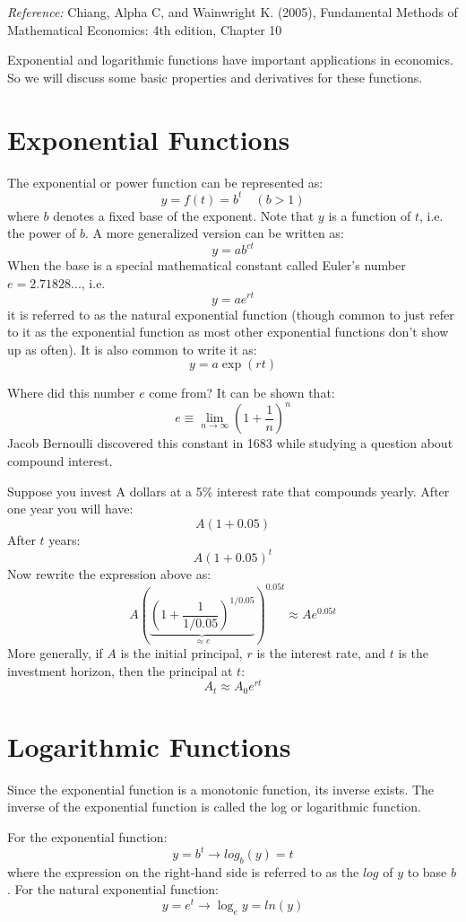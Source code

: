 \documentclass{./../Latex/handout}
\begin{document}
\thispagestyle{plain}

\textit{Reference:} Chiang, Alpha C, and Wainwright K. (2005), Fundamental Methods of Mathematical Economics: 4th edition, Chapter 10 

Exponential and logarithmic functions have important applications in economics. So we will discuss some basic properties and derivatives for these functions.

\section{Exponential Functions}
The exponential or power function can be represented as:
$$
y=f(t)=b^{t} \quad(b>1)
$$
where $b$ denotes a fixed base of the exponent. Note that $y$ is a function of $t$, i.e. the power of $b$. A more generalized version can be written as:
$$
y=a b^{c t}
$$ 
When the base is a special mathematical constant called Euler's number $e=2.71828...$, i.e.
$$
y=a e^{r t}
$$
it is referred to as the natural exponential function (though common to just refer to it as the exponential function as most other exponential functions don't show up as often). It is also common to write it as:
$$
y=a \exp (r t)
$$ 

Where did this number $e$ come from? It can be shown that:
$$
e \equiv \lim _{n \rightarrow \infty}\left(1+\frac{1}{n}\right)^{n}
$$
Jacob Bernoulli discovered this constant in 1683 while studying a question about compound interest. 

Suppose you invest A dollars at a 5\% interest rate that compounds yearly. After one year you will have:
\[ A \left(1+0.05\right)  \] 
After $t$ years:
\[ A \left(1+0.05\right)^{t} \]
Now rewrite the expression above as:
\[ A\left( \underbrace{\left(1+\frac{1}{1/0.05}\right)^{1/0.05}}_{\approx e} \right)^{0.05t} \approx A e^{0.05t}  \]
More generally, if $A$ is the initial principal, $r$ is the interest rate, and $t$ is the investment horizon, then the principal at $t$:
$$ A_t \approx A_0 e^{rt} $$

\section{Logarithmic Functions}
Since the exponential function is a monotonic function, its inverse exists. The inverse of the exponential function is called the log or logarithmic function.

For the exponential function: 
\[ y=b^{t} \rightarrow log_b(y) = t  \]
where the expression on the right-hand side is referred to as the $log$ of $y$ to base $b$. For the natural exponential function:
\[y=e^{t} \rightarrow \log _{e} y =ln(y) \]
\end{document}
